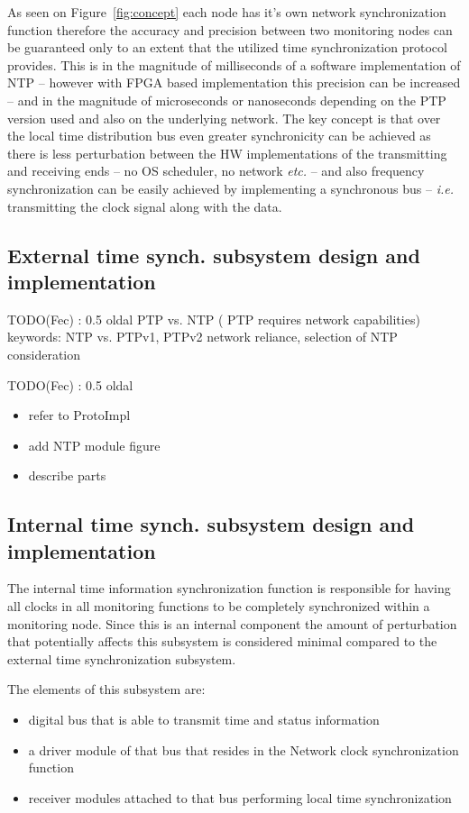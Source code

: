 \documentclass[article]{IEEEtran}
\begin{document}
As seen on Figure~\ref{fig:concept} each node has it's own network synchronization function therefore the accuracy and
precision between two monitoring nodes can be guaranteed only to an extent that the utilized time synchronization
protocol provides. This is in the magnitude of milliseconds of a software implementation of NTP -- however with FPGA based implementation
this precision can be increased --  and in the magnitude of
microseconds or nanoseconds depending on the PTP version used and also on the underlying network.
The key concept is that over the local time distribution bus even greater synchronicity can be achieved as there is less
perturbation between the HW implementations of the transmitting and receiving ends -- no OS scheduler, no network \emph{etc.} --
and also frequency synchronization can be easily achieved by implementing a synchronous bus -- \emph{i.e.} transmitting the
clock signal along with the data.


\subsection{External time synch. subsystem design and implementation}
TODO(Fec) : 0.5 oldal PTP vs. NTP ( PTP requires network capabilities)
keywords: NTP vs. PTPv1, PTPv2 network reliance, selection of NTP consideration

TODO(Fec) : 0.5 oldal
 \begin{itemize}
    \item refer to ProtoImpl
    \item add NTP module figure
    \item describe parts
 \end{itemize}

\subsection{Internal time synch. subsystem design and implementation}\label{sec:Internal-Impl}

The internal time information synchronization function is responsible for having all clocks in all monitoring functions
to be completely synchronized within a monitoring node. Since this is an internal component the amount of perturbation 
that potentially affects this subsystem is considered minimal compared to the external time synchronization subsystem.

The elements of this subsystem are:
\begin{itemize}
    \item digital bus that is able to transmit time and status information
    \item a driver module of that bus that resides in the Network clock synchronization function
    \item receiver modules attached to that bus performing local time synchronization
\end{itemize}
\end{document}
